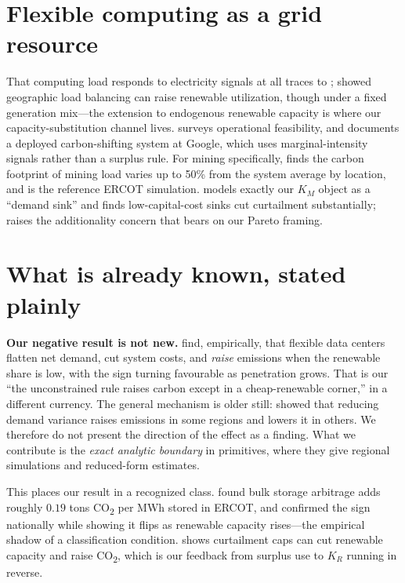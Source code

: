 \documentclass[11pt,reqno]{amsart}
\begin{document}
\section{Flexible computing as a grid resource}
That computing load responds to electricity signals at all traces to \citet{Qureshi2009};
\citet{Liu2011} showed geographic load balancing can raise renewable utilization, though
under a fixed generation mix---the extension to endogenous renewable capacity is where our
capacity-substitution channel lives. \citet{Wierman2014} surveys operational feasibility, and
\citet{Radovanovic2023} documents a deployed carbon-shifting system at Google, which uses
marginal-intensity signals rather than a surplus rule. For mining specifically,
\citet{Menati2023aae} finds the carbon footprint of mining load varies up to 50\% from the
system average by location, and \citet{MenatiLeeXie2023} is the reference ERCOT simulation.
\citet{vanderJagt2024} models exactly our $K_M$ object as a ``demand sink'' and finds
low-capital-cost sinks cut curtailment substantially; \citet{RiepinBrown2024} raises the
additionality concern that bears on our Pareto framing.

\section{What is already known, stated plainly}
\textbf{Our negative result is not new.} \citet{KnittelSengaWang2025} find, empirically, that
flexible data centers flatten net demand, cut system costs, and \emph{raise} emissions when
the renewable share is low, with the sign turning favourable as penetration grows. That is
our ``the unconstrained rule raises carbon except in a cheap-renewable corner,'' in a
different currency. The general mechanism is older still: \citet{HollandMansur2008} showed
that reducing demand variance raises emissions in some regions and lowers it in others. We
therefore do not present the direction of the effect as a finding. What we contribute is the
\emph{exact analytic boundary} in primitives, where they give regional simulations and
reduced-form estimates.

This places our result in a recognized class. \citet{CarsonNovan2013} found bulk storage
arbitrage adds roughly $0.19$ tons CO\textsubscript{2} per MWh stored in ERCOT, and
\citet{HittingerAzevedo2015} confirmed the sign nationally while showing it flips as
renewable capacity rises---the empirical shadow of a classification condition.
\citet{Ding2023} shows curtailment caps can cut renewable capacity and raise
CO\textsubscript{2}, which is our feedback from surplus use to $K_R$ running in reverse.
\end{document}
